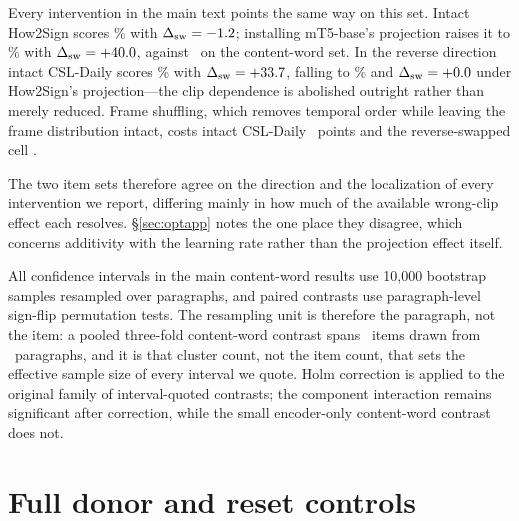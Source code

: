 \documentclass[11pt]{article}
\begin{document}
Every intervention in the main text points the same way on this set. Intact
How2Sign scores \HowtwosignLocal\% with
$\Delta_{\mathrm{sw}}=-1.2$; installing mT5-base's projection
raises it to \HeadHowBaseLocal\% with
$\Delta_{\mathrm{sw}}=+40.0$, against
\HeadHowBaseLexSwapDelta\ on the content-word set. In the reverse direction
intact CSL-Daily scores \CsldailyLocal\% with
$\Delta_{\mathrm{sw}}=+33.7$, falling to \HeadCslHowLocal\% and
$\Delta_{\mathrm{sw}}=+0.0$ under How2Sign's projection---the
clip dependence is abolished outright rather than merely reduced. Frame
shuffling, which removes temporal order while leaving the frame distribution
intact, costs intact CSL-Daily \CsldailyPronShuffleDeltaAbs\ points and the
reverse-swapped cell \HeadCslHowPronShuffleDeltaAbs.

The two item sets therefore agree on the direction and the localization of every
intervention we report, differing mainly in how much of the available wrong-clip
effect each resolves. \S\ref{sec:optapp} notes the one place they disagree, which
concerns additivity with the learning rate rather than the projection effect
itself.

All confidence intervals in the main content-word results use 10{,}000 bootstrap
samples resampled over paragraphs, and paired contrasts use paragraph-level
sign-flip permutation tests. The resampling unit is therefore the paragraph, not
the item: a pooled three-fold content-word contrast spans \LexItemsN\ items
drawn from \LexClustersN\ paragraphs, and it is that cluster count, not the item
count, that sets the effective sample size of every interval we quote. Holm
correction is applied to the original family of interval-quoted contrasts; the
component interaction remains significant after correction, while the small
encoder-only content-word contrast does not.

\section{Full donor and reset controls}
\label{sec:donors}
\end{document}
